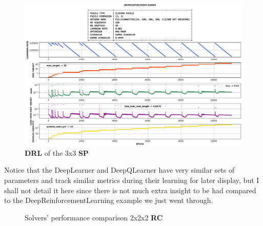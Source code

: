 \begin{figure}[H]
\centering
\includegraphics[align=c, scale=0.42]{./Figures/33SPDeepReinforcementLearning}
\caption[33SPDeepReinforcementLearning]{\textbf{DRL} of the 3x3 \textbf{SP}}
\label{fig:33SPDeepReinforcementLearning}
\end{figure}

Notice that the DeepLearner and DeepQLearner have very similar sets of parameters and track similar metrics during their learning for later display, but I shall not detail it here since there is not much extra insight to be had compared to the DeepReinforcementLearning example we just went through.







\begin{figure}[H]
  \noindent
  \caption[222RCPerformance]{Solvers' performance comparison 2x2x2 \textbf{RC}}
  \label{fig:222RCPerformance}
\end{figure}



